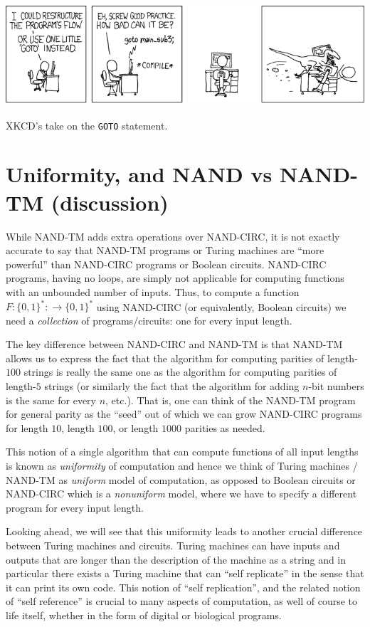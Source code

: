 \begin{marginfigure}
\centering
\includegraphics[width=\linewidth, height=1.5in, keepaspectratio]{../figure/xkcdgoto.png}
\caption{XKCD's take on the \texttt{GOTO} statement.}
\label{xkcdgotofig}
\end{marginfigure}

\section{Uniformity, and NAND vs NAND-TM
(discussion)}\label{Uniformity-and-NAND-vs-NA}

While NAND-TM adds extra operations over NAND-CIRC, it is not exactly
accurate to say that NAND-TM programs or Turing machines are ``more
powerful'' than NAND-CIRC programs or Boolean circuits. NAND-CIRC
programs, having no loops, are simply not applicable for computing
functions with an unbounded number of inputs. Thus, to compute a
function \(F:\{0,1\}^* :\rightarrow \{0,1\}^*\) using NAND-CIRC (or
equivalently, Boolean circuits) we need a \emph{collection} of
programs/circuits: one for every input length.

The key difference between NAND-CIRC and NAND-TM is that NAND-TM allows
us to express the fact that the algorithm for computing parities of
length-\(100\) strings is really the same one as the algorithm for
computing parities of length-\(5\) strings (or similarly the fact that
the algorithm for adding \(n\)-bit numbers is the same for every \(n\),
etc.). That is, one can think of the NAND-TM program for general parity
as the ``seed'' out of which we can grow NAND-CIRC programs for length
\(10\), length \(100\), or length \(1000\) parities as needed.

This notion of a single algorithm that can compute functions of all
input lengths is known as \emph{uniformity} of computation and hence we
think of Turing machines / NAND-TM as \emph{uniform} model of
computation, as opposed to Boolean circuits or NAND-CIRC which is a
\emph{nonuniform} model, where we have to specify a different program
for every input length.

Looking ahead, we will see that this uniformity leads to another crucial
difference between Turing machines and circuits. Turing machines can
have inputs and outputs that are longer than the description of the
machine as a string and in particular there exists a Turing machine that
can ``self replicate'' in the sense that it can print its own code. This
notion of ``self replication'', and the related notion of ``self
reference'' is crucial to many aspects of computation, as well of course
to life itself, whether in the form of digital or biological programs.

